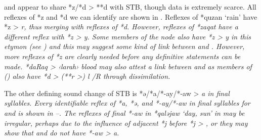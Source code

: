  and  appear to share *z/*d > **d with STB,
though data is extremely scarce.
All reflexes of *z
and *d we can identify are shown in .
Reflexes of *quzan ‘rain’ have *z > \it{r},
thus merging with reflexes of *d.
However, reflexes of *zaqat have a different reflex with *z > \it{y}.
Some members of the  node also have *z
> \it{y} in this etymon (see )
and this may suggest some kind of link
between  and .
However, more reflexes of *z are clearly needed before any definitive
statements can be made.
 *daRaq > ‹larah› blood may also attest a link between
 and  as members of 
() also have *d > (**r >) \it{l} /{\gap}R through dissimilation.


The other defining sound change of STB
is *ə/*a/*-ay/*-aw > \it{a} in final syllables.
Every identifiable reflex of *a,
*ə, and *-ay/*-aw in final syllables for 
and  is shown in --.
The reflexes of final *-aw in *qaləjaw ‘day,
sun’ in  may be irregular,
perhaps due to the influence of adjacent *j
before *j > {\0}, or they may show that
 and  do not have *-aw > \it{a}.

